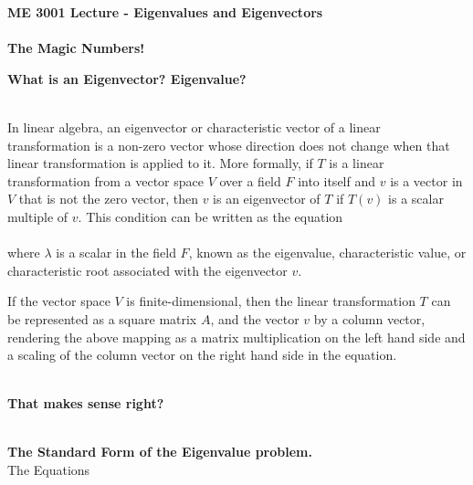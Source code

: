 \documentclass[11pt]{article}
\begin{document}
\textbf{ \LARGE ME 3001 Lecture - Eigenvalues and Eigenvectors} \\\\
\textbf{ \LARGE The Magic Numbers!} \\

\begin{itemize}

	\item  \textbf{\LARGE What is an Eigenvector? Eigenvalue?}\\\\
\Large{
	In linear algebra, an eigenvector or characteristic vector of a linear transformation is a non-zero vector whose direction does not change when that linear transformation is applied to it. More formally, if $T$ is a linear transformation from a vector space $V$ over a field $F$ into itself and $v$ is a vector in $V$ that is not the zero vector, then $v$ is an eigenvector of $T$ if $T(v)$ is a scalar multiple of $v$. This condition can be written as the equation\\

\\

where $\lambda$ is a scalar in the field $F$, known as the eigenvalue, characteristic value, or characteristic root associated with the eigenvector $v$.

If the vector space $V$ is finite-dimensional, then the linear transformation $T$ can be represented as a square matrix $A$, and the vector $v$ by a column vector, rendering the above mapping as a matrix multiplication on the left hand side and a scaling of the column vector on the right hand side in the equation.\\


\\

\item  \textbf{\LARGE That makes sense right?}\\\\

\newpage
\item  \textbf{\LARGE The Standard Form of the Eigenvalue problem.}\\

 
		The Equations \\\\ 
		   \vspace{2mm}\\
		   \\
		  \\
		  \\
		   \\	
		  
}
\end{itemize}
\end{document}
